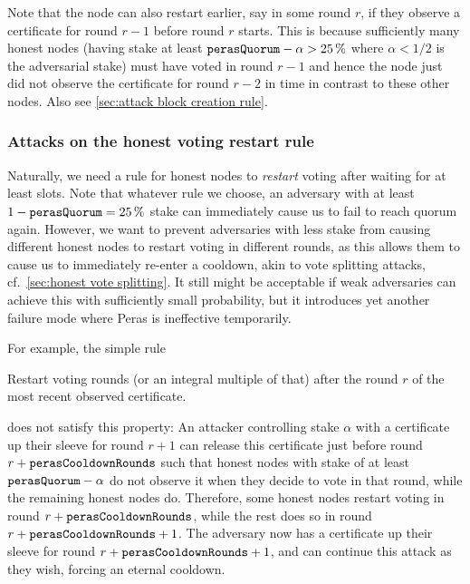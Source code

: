 Note that the node can also restart earlier, say in some round $r$, if they observe a certificate for round $r-1$ before round $r$ starts.
This is because sufficiently many honest nodes (having stake at least $\mathtt{perasQuorum} - \alpha > \qty{25}{\percent}$ where $\alpha<1/2$ is the adversarial stake) must have voted in round $r-1$ and hence the node just did not observe the certificate for round $r-2$ in time in contrast to these other nodes.
Also see \cref{sec:attack block creation rule}.

\subsubsection{Attacks on the honest voting restart rule}

Naturally, we need a rule for honest nodes to \emph{restart} voting after waiting for at least \Theal{} slots.
Note that whatever rule we choose, an adversary with at least $1-\mathtt{perasQuorum} = \qty{25}{\percent}$ stake can immediately cause us to fail to reach quorum again.
However, we want to prevent adversaries with less stake from causing different honest nodes to restart voting in different rounds, as this allows them to cause us to immediately re-enter a cooldown, akin to vote splitting attacks, cf.~\cref{sec:honest vote splitting}.
It still might be acceptable if weak adversaries can achieve this with sufficiently small probability, but it introduces yet another failure mode where Peras is ineffective temporarily.

For example, the simple rule
\begin{tcolorbox}
  Restart voting \perasCooldownRounds{} rounds (or an integral multiple of that) after the round $r$ of the most recent observed certificate.
\end{tcolorbox}
\parindent0pt
does not satisfy this property:
An attacker controlling stake $\alpha$ with a certificate up their sleeve for round $r+1$ can release this certificate just before round $r+\mathtt{perasCooldownRounds}$ such that honest nodes with stake of at least $\mathtt{perasQuorum} - \alpha$ do not observe it when they decide to vote in that round, while the remaining honest nodes do.
Therefore, some honest nodes restart voting in round $r+\mathtt{perasCooldownRounds}$, while the rest does so in round $r+\mathtt{perasCooldownRounds}+1$.
The adversary now has a certificate up their sleeve for round $r+\mathtt{perasCooldownRounds}+1$, and can continue this attack as they wish, forcing an eternal cooldown.

